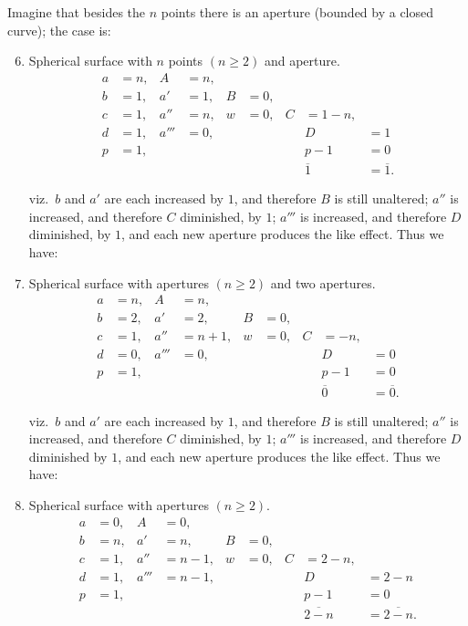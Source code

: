 \documentclass[11pt,a4paper]{book}
\begin{document}
\clearpage

Imagine that besides the $n$ points there is an aperture (bounded by a closed curve);
the case is:

\begin{enumerate}
\setcounter{enumi}{5}
\item Spherical surface with $n$ points $(n \geq 2)$ and aperture.
\begin{align*}
a &= n, & A &= n, \\
b &= 1, & a' &= 1, & B &= 0, \\
c &= 1, & a'' &= n, & w &= 0, & C &= 1 - n, \\
d &= 1, & a''' &= 0, & & & & D &= 1 \\
p &= 1, & & & & & & p - 1 &= 0 \\[2pt]
& & & & & & & \overline{1} &= \overline{1}.
\end{align*}

viz.\ $b$ and $a'$ are each increased by $1$, and therefore $B$ is still unaltered; $a''$ is increased,
and therefore $C$ diminished, by $1$; $a'''$ is increased, and therefore $D$ diminished, by $1$,
and each new aperture produces the like effect. Thus we have:

\item Spherical surface with apertures $(n \geq 2)$ and two apertures.
\begin{align*}
a &= n, & A &= n, \\
b &= 2, & a' &= 2, & B &= 0, \\
c &= 1, & a'' &= n + 1, & w &= 0, & C &= -n, \\
d &= 0, & a''' &= 0, & & & & D &= 0 \\
p &= 1, & & & & & & p - 1 &= 0 \\[2pt]
& & & & & & & \overline{0} &= \overline{0}.
\end{align*}

viz.\ $b$ and $a'$ are each increased by $1$, and therefore $B$ is still unaltered; $a''$ is increased,
and therefore $C$ diminished, by $1$; $a'''$ is increased, and therefore $D$ diminished by $1$,
and each new aperture produces the like effect. Thus we have:

\item Spherical surface with apertures $(n \geq 2)$.
\begin{align*}
a &= 0, & A &= 0, \\
b &= n, & a' &= n, & B &= 0, \\
c &= 1, & a'' &= n - 1, & w &= 0, & C &= 2 - n, \\
d &= 1, & a''' &= n - 1, & & & & D &= 2 - n \\
p &= 1, & & & & & & p - 1 &= 0 \\[2pt]
& & & & & & & \overline{2 - n} &= \overline{2 - n}.
\end{align*}


\end{enumerate}
\end{document}
